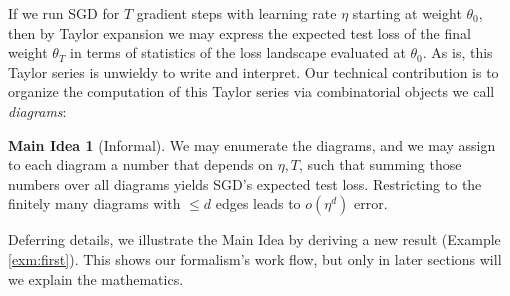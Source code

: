 \documentclass{article}
\theoremstyle{plain}
\theoremstyle{definition}
\newtheorem*{midea*}{Main Idea}
\begin{document}
        If we run SGD for $T$ gradient steps with learning rate $\eta$ starting
        at weight $\theta_0$, then by Taylor expansion we may express the
        expected test loss of the final weight $\theta_T$ in terms of
        statistics of the loss landscape evaluated at $\theta_0$.
        As is, this Taylor series is unwieldy to write and interpret.
        Our technical contribution is to organize the computation of this
        Taylor series via combinatorial objects we call
        \emph{diagrams}:
        \begin{midea*}[Informal]
            We may enumerate the diagrams, and we may assign to
            each diagram a number that depends on $\eta, T$, such that
            summing those numbers over all diagrams yields SGD's expected test
            loss.  Restricting to the finitely many diagrams with $\leq d$
            edges leads to $o(\eta^d)$ error.
        \end{midea*}

        Deferring details, we illustrate the Main Idea by deriving a new result
        (Example \ref{exm:first}).  This shows our formalism's work flow,
        but only in later sections will we explain the mathematics.
\end{document}
